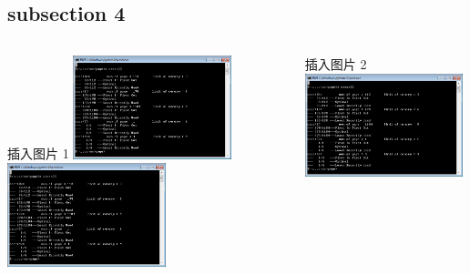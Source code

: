 \documentclass{beamer}
\begin{document}
\subsection{subsection 4}
\begin{frame}
\begin{columns}[t]
		\begin{theorem}{插入图片 1 }
			\includegraphics[height=3cm]{page.png}
			\newline
			\includegraphics[height=3cm]{page.png}
		\end{theorem}
		\begin{theorem}{插入图片 2 }
			\includegraphics[height=3cm]{page.png}
		\end{theorem}
\end{columns}
\end{frame}
\end{document}
